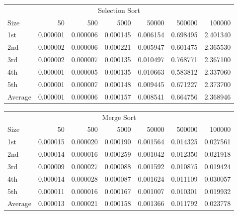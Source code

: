 \documentclass{article}
\begin{document}
\begin{table}[htbp]
  \centering
    \begin{tabular}{lrrrrrr}
    \multicolumn{7}{c}{Selection Sort} \\
    Size  & 50    & 500   & 5000  & 50000  & 500000  & 100000  \\ \hline
    1st   & 0.000001  & 0.000006  & 0.000145  & 0.006154  & 0.698495  & 2.401340  \\
    2nd   & 0.000002  & 0.000006  & 0.000221  & 0.005947  & 0.601475  & 2.365530  \\
    3rd   & 0.000002  & 0.000007  & 0.000135  & 0.010497  & 0.768771  & 2.367100  \\
    4th   & 0.000001  & 0.000005  & 0.000135  & 0.010663  & 0.583812  & 2.337060  \\
    5th   & 0.000001  & 0.000007  & 0.000148  & 0.009445  & 0.671227  & 2.373700  \\
    Average & 0.000001  & 0.000006  & 0.000157  & 0.008541  & 0.664756  & 2.368946  \\
    \end{tabular}%
  \label{tab:addlabel}%
\end{table}%


\begin{table}[htbp]
  \centering
    \begin{tabular}{lrrrrrr}
    \multicolumn{7}{c}{Merge Sort} \\
    Size  & 50    & 500   & 5000  & 50000  & 500000  & 100000  \\ \hline
    1st   & 0.000015  & 0.000020  & 0.000190  & 0.001564  & 0.014325  & 0.027561  \\
    2nd   & 0.000014  & 0.000016  & 0.000259  & 0.001042  & 0.012350  & 0.021918  \\
    3rd   & 0.000009  & 0.000027  & 0.000088  & 0.001592  & 0.010875  & 0.019424  \\
    4th   & 0.000014  & 0.000028  & 0.000087  & 0.001624  & 0.011109  & 0.030057  \\
    5th   & 0.000011  & 0.000016  & 0.000167  & 0.001007  & 0.010301  & 0.019932  \\
    Average & 0.000013  & 0.000021  & 0.000158  & 0.001366  & 0.011792  & 0.023778  \\
    \end{tabular}%
  \label{tab:addlabel}%
\end{table}%
\end{document}
